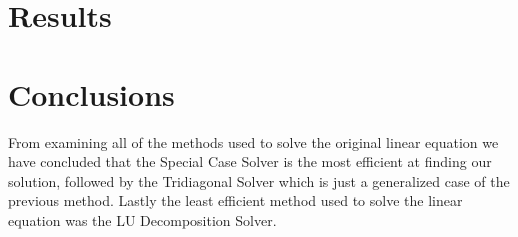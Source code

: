 \documentclass[12pt]{article}
\begin{document}
\section{Results}

\section{Conclusions}
From examining all of the methods used to solve the original linear equation we have concluded that the Special Case Solver is the most efficient at finding our solution, followed by the Tridiagonal Solver which is just a generalized case of the previous method. Lastly the least efficient method used to solve the linear equation was the LU Decomposition Solver. 








	
\end{document}
